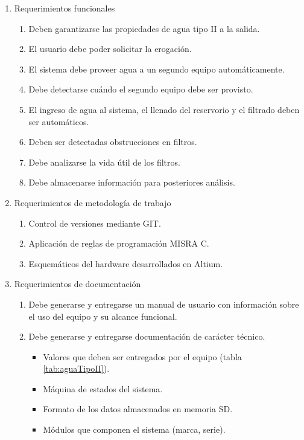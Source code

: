 \documentclass[
11pt, %
]{charter}
\begin{document}
\begin{enumerate}
	\item Requerimientos funcionales
		\begin{enumerate}
			\item Deben garantizarse las propiedades de agua tipo II a la salida.
			\item El usuario debe poder solicitar la erogación.
			\item El sistema debe proveer agua a un segundo equipo automáticamente.
			\item Debe detectarse cuándo el segundo equipo debe ser provisto.
			\item El ingreso de agua al sistema, el llenado del reservorio y el filtrado deben ser automáticos.
			\item Deben ser detectadas obstrucciones en filtros.
			\item Debe analizarse la vida útil de los filtros.
			\item Debe almacenarse información para posteriores análisis.
		\end{enumerate}
	\item Requerimientos de metodología de trabajo
		\begin{enumerate}
			\item Control de versiones mediante GIT.
			\item Aplicación de reglas de programación MISRA C.
			\item Esquemáticos del hardware desarrollados en Altium.
		\end{enumerate}
	\item Requerimientos de documentación
		\begin{enumerate}
			\item Debe generarse y entregarse un manual de usuario con información sobre el uso del equipo y su alcance funcional.
			\item Debe generarse y entregarse documentación de carácter técnico.
			\begin{itemize}
				\item Valores que deben ser entregados por el equipo (tabla \ref{tab:aguaTipoII}).
				\item Máquina de estados del sistema.
				\item Formato de los datos almacenados en memoria SD.
				\item Módulos que componen el sistema (marca, serie).
			\end{itemize}
		\end{enumerate}
\end{enumerate}
\end{document}
